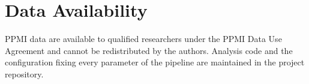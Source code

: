 \documentclass[11pt]{article}
\begin{document}
\section*{Data Availability}
PPMI data are available to qualified researchers under the PPMI Data Use
Agreement and cannot be redistributed by the authors. Analysis code and the
configuration fixing every parameter of the pipeline are maintained in the
project repository.

\setlength{\bibsep}{4pt}


\end{document}
